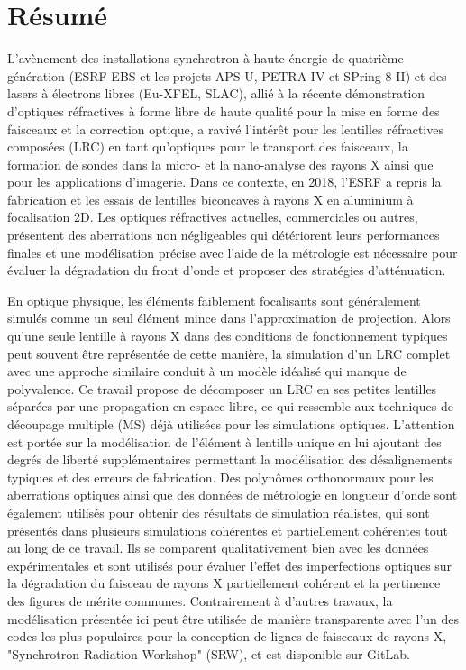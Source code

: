 \chapter*{Résumé}
\label{sec:abstractFR}
\vspace*{-10mm}

L'avènement des installations synchrotron à haute énergie de quatrième génération (ESRF-EBS et les projets APS-U, PETRA-IV et SPring-8 II) et des lasers à électrons libres (Eu-XFEL, SLAC), allié à la récente démonstration d'optiques réfractives à forme libre de haute qualité pour la mise en forme des faisceaux et la correction optique, a ravivé l'intérêt pour les lentilles réfractives composées (LRC) en tant qu'optiques pour le transport des faisceaux, la formation de sondes dans la micro- et la nano-analyse des rayons X ainsi que pour les applications d'imagerie. Dans ce contexte, en 2018, l'ESRF a repris la fabrication et les essais de lentilles biconcaves à rayons X en aluminium à focalisation 2D. Les optiques réfractives actuelles, commerciales ou autres, présentent des aberrations non négligeables qui détériorent leurs performances finales et une modélisation précise avec l'aide de la métrologie est nécessaire pour évaluer la dégradation du front d'onde et proposer des stratégies d'atténuation.

En optique physique, les éléments faiblement focalisants sont généralement simulés comme un seul élément mince dans l'approximation de projection. Alors qu'une seule lentille à rayons X dans des conditions de fonctionnement typiques peut souvent être représentée de cette manière, la simulation d'un LRC complet avec une approche similaire conduit à un modèle idéalisé qui manque de polyvalence. Ce travail propose de décomposer un LRC en ses petites lentilles séparées par une propagation en espace libre, ce qui ressemble aux techniques de découpage multiple (MS) déjà utilisées pour les simulations optiques. L'attention est portée sur la modélisation de l'élément à lentille unique en lui ajoutant des degrés de liberté supplémentaires permettant la modélisation des désalignements typiques et des erreurs de fabrication. Des polynômes orthonormaux pour les aberrations optiques ainsi que des données de métrologie en longueur d'onde sont également utilisés pour obtenir des résultats de simulation réalistes, qui sont présentés dans plusieurs simulations cohérentes et partiellement cohérentes tout au long de ce travail. Ils se comparent qualitativement bien avec les données expérimentales et sont utilisés pour évaluer l'effet des imperfections optiques sur la dégradation du faisceau de rayons X partiellement cohérent et la pertinence des figures de mérite communes. Contrairement à d'autres travaux, la modélisation présentée ici peut être utilisée de manière transparente avec l'un des codes les plus populaires pour la conception de lignes de faisceaux de rayons X, "Synchrotron Radiation Workshop" (SRW), et est disponible sur GitLab.

